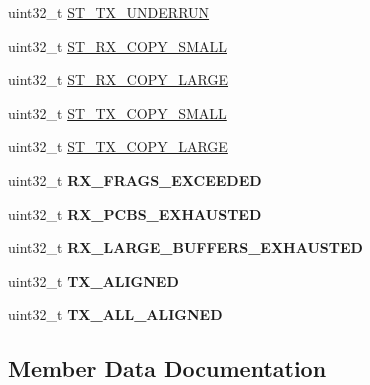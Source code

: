 \begin{DoxyCompactItemize}
\item 
uint32\+\_\+t \hyperlink{structenet__stats_a2d06ba5b567fe022065f6d897fb68248}{S\+T\+\_\+\+T\+X\+\_\+\+U\+N\+D\+E\+R\+R\+UN}
\item 
uint32\+\_\+t \hyperlink{structenet__stats_a29e168a381e01950a1bf6df28631e651}{S\+T\+\_\+\+R\+X\+\_\+\+C\+O\+P\+Y\+\_\+\+S\+M\+A\+LL}
\item 
uint32\+\_\+t \hyperlink{structenet__stats_ae09ec2a15529a19f6fa07b961e1d207d}{S\+T\+\_\+\+R\+X\+\_\+\+C\+O\+P\+Y\+\_\+\+L\+A\+R\+GE}
\item 
uint32\+\_\+t \hyperlink{structenet__stats_ac86c8c40bc04308c6e27d8d9c5db145f}{S\+T\+\_\+\+T\+X\+\_\+\+C\+O\+P\+Y\+\_\+\+S\+M\+A\+LL}
\item 
uint32\+\_\+t \hyperlink{structenet__stats_af9463656968090740043060dd4b58089}{S\+T\+\_\+\+T\+X\+\_\+\+C\+O\+P\+Y\+\_\+\+L\+A\+R\+GE}
\item 
uint32\+\_\+t {\bfseries R\+X\+\_\+\+F\+R\+A\+G\+S\+\_\+\+E\+X\+C\+E\+E\+D\+ED}\hypertarget{structenet__stats_ac50f037569d40aa6468a4d0cb941c36f}{}\label{structenet__stats_ac50f037569d40aa6468a4d0cb941c36f}

\item 
uint32\+\_\+t {\bfseries R\+X\+\_\+\+P\+C\+B\+S\+\_\+\+E\+X\+H\+A\+U\+S\+T\+ED}\hypertarget{structenet__stats_a80cfb22b697f8ad7ebcfe914d65463da}{}\label{structenet__stats_a80cfb22b697f8ad7ebcfe914d65463da}

\item 
uint32\+\_\+t {\bfseries R\+X\+\_\+\+L\+A\+R\+G\+E\+\_\+\+B\+U\+F\+F\+E\+R\+S\+\_\+\+E\+X\+H\+A\+U\+S\+T\+ED}\hypertarget{structenet__stats_aca46f8b1dfae23ef4e7c8fe8743ca659}{}\label{structenet__stats_aca46f8b1dfae23ef4e7c8fe8743ca659}

\item 
uint32\+\_\+t {\bfseries T\+X\+\_\+\+A\+L\+I\+G\+N\+ED}\hypertarget{structenet__stats_a1e5dd1d66e620700fd407aba40e8410e}{}\label{structenet__stats_a1e5dd1d66e620700fd407aba40e8410e}

\item 
uint32\+\_\+t {\bfseries T\+X\+\_\+\+A\+L\+L\+\_\+\+A\+L\+I\+G\+N\+ED}\hypertarget{structenet__stats_a8f99fb00238eabca1acb8654af2d81b6}{}\label{structenet__stats_a8f99fb00238eabca1acb8654af2d81b6}

\end{DoxyCompactItemize}


\subsection{Member Data Documentation}
